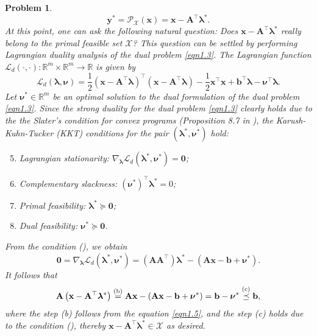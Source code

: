 \documentclass[11pt]{article}
\newtheorem{problem}{Problem}
\begin{document}
\begin{problem}
{\begin{equation}
    \label{eqn1.4}
    \mathbf{y}^* = \mathcal{P}_{\mathcal{X}}(\mathbf{x}) = \mathbf{x} - \mathbf{A}^{\top} \bm{\lambda}^*.
\end{equation}
At this point, one can ask the following natural question: Does $\mathbf{x} - \mathbf{A}^{\top} \bm{\lambda}^*$ really belong to the primal feasible set $\mathcal{X}$? This question can be settled by performing Lagrangian duality analysis of the dual problem \eqref{eqn1.3}. The Lagrangian function $\mathcal{L}_d \left( \cdot, \cdot \right) : \mathbb{R}^m \times \mathbb{R}^m \rightarrow \mathbb{R}$ is given by
\begin{equation*}
    \mathcal{L}_d \left( \bm{\lambda}, \bm{\nu} \right)
    = \frac{1}{2} \left( \mathbf{x} - \mathbf{A}^{\top} \bm{\lambda} \right)^{\top} \left( \mathbf{x} - \mathbf{A}^{\top} \bm{\lambda} \right) - \frac{1}{2} \mathbf{x}^{\top} \mathbf{x} + \mathbf{b}^{\top} \bm{\lambda} - \bm{\nu}^{\top} \bm{\lambda}.
\end{equation*}
Let $\bm{\nu}^* \in \mathbb{R}^m$ be an optimal solution to the dual formulation of the dual problem \eqref{eqn1.3}. Since the strong duality for the dual problem \eqref{eqn1.3} clearly holds due to the the Slater's condition for convex programs (\emph{Proposition 8.7} in \cite{calafiore2014optimization}), the Karush-Kuhn-Tucker (KKT) conditions for the pair $\left( \bm{\lambda}^*, \bm{\nu}^* \right)$ hold:
\begin{enumerate} [label=(\roman*)]
    \setcounter{enumi}{4}
    \item Lagrangian stationarity: $\nabla_{\bm{\lambda}} \mathcal{L}_d \left( \bm{\lambda}^*, \bm{\nu}^* \right) = \mathbf{0}$;
    \item Complementary slackness: $\left( \bm{\nu}^* \right)^{\top} \bm{\lambda}^* = 0$;
    \item Primal feasibility: $\bm{\lambda}^* \succeq \mathbf{0}$;
    \item Dual feasibility: $\bm{\nu}^* \succeq \mathbf{0}$.
\end{enumerate}
From the condition (), we obtain
\begin{equation}
    \label{eqn1.5}
    \mathbf{0} = \nabla_{\bm{\lambda}} \mathcal{L}_d \left( \bm{\lambda}^*, \bm{\nu}^* \right) = \left( \mathbf{A} \mathbf{A}^{\top} \right) \bm{\lambda}^* - \left( \mathbf{Ax} - \mathbf{b} + \bm{\nu}^* \right).
\end{equation}
It follows that
\begin{equation*}
    \mathbf{A} \left( \mathbf{x} - \mathbf{A}^{\top} \bm{\lambda}^* \right) 
    \stackrel{\textnormal{(b)}}{=} \mathbf{Ax} - \left( \mathbf{Ax} - \mathbf{b} + \bm{\nu}^* \right)
    = \mathbf{b} - \bm{\nu}^* 
    \stackrel{\textnormal{(c)}}{\preceq} \mathbf{b},
\end{equation*}
where the step (b) follows from the equation \eqref{eqn1.5}, and the step (c) holds due to the condition (), thereby $\mathbf{x} - \mathbf{A}^{\top} \bm{\lambda}^* \in \mathcal{X}$ as desired.
}
\end{problem}
\end{document}
